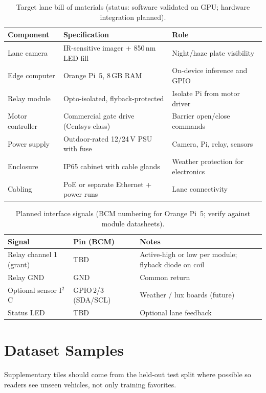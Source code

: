 \documentclass[10pt, conference]{IEEEtran}
\begin{document}
{\footnotesize
\setlength{\tabcolsep}{3pt}
\renewcommand{\arraystretch}{1.05}
\begin{table}[!htbp]
\centering
\caption{Target lane bill of materials (status: software validated on GPU; hardware integration planned).}
\label{tab:hwapp}
\begin{tabular}{@{}p{}p{}p{}@{}}
\toprule
Component & Specification & Role \\
\midrule
Lane camera & IR-sensitive imager + 850\,nm LED fill & Night/haze plate visibility \\
Edge computer & Orange Pi~5, 8\,GB RAM & On-device inference and GPIO \\
Relay module & Opto-isolated, flyback-protected & Isolate Pi from motor driver \\
Motor controller & Commercial gate drive (Centsys-class) & Barrier open/close commands \\
Power supply & Outdoor-rated 12/24\,V PSU with fuse & Camera, Pi, relay, sensors \\
Enclosure & IP65 cabinet with cable glands & Weather protection for electronics \\
Cabling & PoE or separate Ethernet + power runs & Lane connectivity \\
\bottomrule
\end{tabular}
\end{table}

\begin{table}[!htbp]
\centering
\caption{Planned interface signals (BCM numbering for Orange Pi~5; verify against module datasheets).}
\begin{tabular}{@{}p{}p{}p{}@{}}
\toprule
Signal & Pin (BCM) & Notes \\
\midrule
Relay channel 1 (grant) & TBD & Active-high or low per module; flyback diode on coil \\
Relay GND & GND & Common return \\
Optional sensor I$^2$C & GPIO\,2/3 (SDA/SCL) & Weather / lux boards (future) \\
Status LED & TBD & Optional lane feedback \\
\bottomrule
\end{tabular}
\end{table}
}

\section{Dataset Samples}
Supplementary tiles should come from the held-out test split where possible so readers see unseen vehicles, not only training favorites.

\clearpage
\balance
\nocite{r01,r02,r03,r04,r05,r06,r07,r08,r09,r10,r11,r12,r13,r14,r15,r16,r17,r18,r19,r20,r21,r22,r23,r24,r25,r26,r27,r28,r29,r30,r31,r32,r33,r34,r35,r36,r37,r38,r39,r40,r41,r42}


\end{document}
